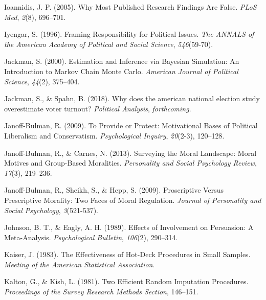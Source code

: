 \documentclass[12pt,econ]{sources/authesis}
\newenvironment{CSLReferences}%
  {}%
  {\par}
\begin{document}
\begin{CSLReferences}{1}{0}
\leavevmode{}%
Ioannidis, J. P. (2005). {Why Most Published Research Findings Are False}. \emph{PLoS Med}, \emph{2}(8), 696--701.

\leavevmode{}%
Iyengar, S. (1996). Framing {Responsibility} for {Political} {Issues}. \emph{The ANNALS of the American Academy of Political and Social Science}, \emph{546}(59-70).

\leavevmode{}%
Jackman, S. (2000). {Estimation and Inference via Bayesian Simulation: An Introduction to Markov Chain Monte Carlo}. \emph{American Journal of Political Science}, \emph{44}(2), 375--404.

\leavevmode{}%
Jackman, S., \& Spahn, B. (2018). Why does the american national election study overestimate voter turnout? \emph{Political Analysis}, \emph{forthcoming}.

\leavevmode{}%
Janoff-Bulman, R. (2009). {To Provide or Protect: Motivational Bases of Political Liberalism and Conservatism}. \emph{Psychological Inquiry}, \emph{20}(2-3), 120--128.

\leavevmode{}%
Janoff-Bulman, R., \& Carnes, N. (2013). {Surveying the Moral Landscape: Moral Motives and Group-Based Moralities}. \emph{Personality and Social Psychology Review}, \emph{17}(3), 219--236.

\leavevmode{}%
Janoff-Bulman, R., Sheikh, S., \& Hepp, S. (2009). {Proscriptive Versus Prescriptive Morality: Two Faces of Moral Regulation}. \emph{Journal of Personality and Social Psychology}, \emph{3}(521-537).

\leavevmode{}%
Johnson, B. T., \& Eagly, A. H. (1989). {Effects of Involvement on Persuasion: A Meta-Analysis}. \emph{Psychological Bulletin}, \emph{106}(2), 290--314.

\leavevmode{}%
Kaiser, J. (1983). {The Effectiveness of Hot-Deck Procedures in Small Samples}. \emph{Meeting of the American Statistical Association}.

\leavevmode{}%
Kalton, G., \& Kish, L. (1981). {Two Efficient Random Imputation Procedures}. \emph{Proceedings of the Survey Research Methods Section}, 146--151.


\end{CSLReferences}
\end{document}
